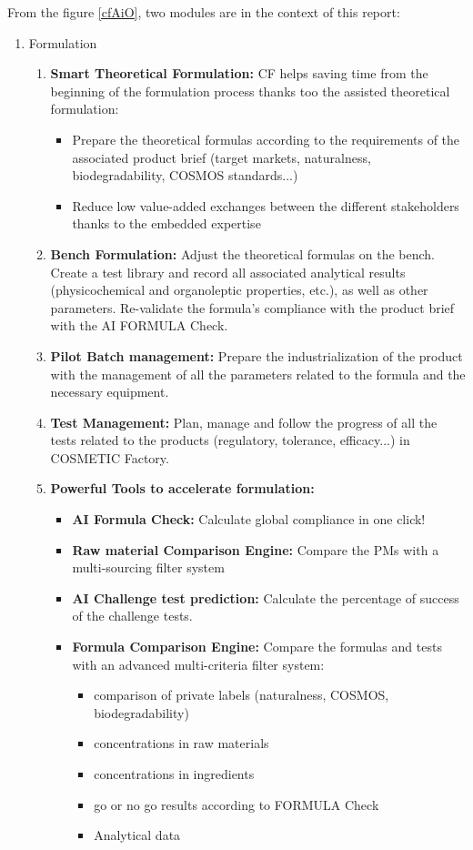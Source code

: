\documentclass[a4paper,12pt,twoside]{report}
\begin{document}
From the figure \ref{cfAiO}, two modules are in the context of this report:
\begin{enumerate}
\item Formulation
	\begin{enumerate}
	\item \textbf{Smart Theoretical Formulation:} CF helps saving time from the beginning of the formulation process thanks too the assisted theoretical formulation:
		\begin{itemize}
		\item Prepare the theoretical formulas according to the 
requirements of the associated product brief (target 
markets, naturalness, biodegradability, COSMOS standards...) 
		\item Reduce low value-added exchanges between the different 
stakeholders thanks to the embedded expertise
		\end{itemize}
	\item \textbf{Bench Formulation:} Adjust the theoretical formulas on the bench. Create a test 
library and record all associated analytical results (physicochemical 
and organoleptic properties, etc.), as well as other parameters. 
Re-validate the formula's compliance with the product brief with 
the AI FORMULA Check.
	\item \textbf{Pilot Batch management:} Prepare the industrialization of the product with the management 
of all the parameters related to the formula and the necessary 
equipment.
	\item \textbf{Test Management:} Plan, manage and follow the progress of all the tests related to the 
products (regulatory, tolerance, efficacy...) in COSMETIC Factory. 
	\item \textbf{Powerful Tools to accelerate formulation:}
	
	\begin{itemize}
		\item \textbf{AI Formula Check:} Calculate global compliance in one click!
		\item \textbf{Raw material Comparison Engine:}  Compare the PMs with 
a multi-sourcing filter system
		\item \textbf{AI Challenge test prediction:} Calculate the percentage of success of the challenge tests.
		\item \textbf{Formula Comparison Engine:} Compare the formulas and tests with an advanced multi-criteria filter system:
			\begin{itemize}
				\item comparison of private labels (naturalness, COSMOS, biodegradability)
				\item concentrations in raw materials
				\item concentrations in ingredients
				\item go or no go results according to FORMULA Check
				\item Analytical data
			\end{itemize}


\end{itemize}
\end{enumerate}
\end{enumerate}
\end{document}
